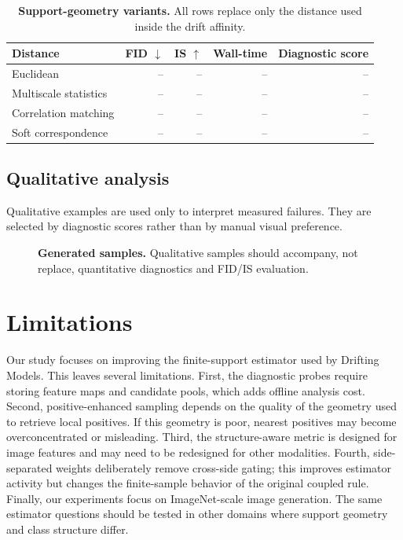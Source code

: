 \documentclass{article}
\newcommand{\placeholderbox}[2]{
\begin{center}
\fbox{
\begin{minipage}[c][#1][c]{0.92\linewidth}
\centering
\textcolor{mlgray}{#2}
\end{minipage}
}
\end{center}
}
\begin{document}
\begin{table}[h!]
\centering
\caption{
\textbf{Support-geometry variants.}
All rows replace only the distance used inside the drift affinity.
}
\label{tab:metric_variants}
\begin{tabular}{lrrrr}
\toprule
Distance & FID $\downarrow$ & IS $\uparrow$ & Wall-time & Diagnostic score \\
\midrule
Euclidean & -- & -- & -- & -- \\
Multiscale statistics & -- & -- & -- & -- \\
Correlation matching & -- & -- & -- & -- \\
Soft correspondence & -- & -- & -- & -- \\
\bottomrule
\end{tabular}
\end{table}



\subsection{Qualitative analysis}
\label{subsec:qualitative_analysis}

Qualitative examples are used only to interpret measured failures.
They are selected by diagnostic scores rather than by manual visual preference.

\begin{figure}[h!]
\centering
\placeholderbox{0.28\textheight}{
Sample grid.\\
Rows: baseline, strongest single-component variant, full estimator.\\
Columns: ImageNet classes or random seeds.
}
\caption{
\textbf{Generated samples.}
Qualitative samples should accompany, not replace, quantitative diagnostics and FID/IS evaluation.
}
\label{fig:sample_grid}
\end{figure}



\section{Limitations}
\label{sec:limitations}

Our study focuses on improving the finite-support estimator used by Drifting Models.
This leaves several limitations.
First, the diagnostic probes require storing feature maps and candidate pools, which adds offline analysis cost.
Second, positive-enhanced sampling depends on the quality of the geometry used to retrieve local positives.
If this geometry is poor, nearest positives may become overconcentrated or misleading.
Third, the structure-aware metric is designed for image features and may need to be redesigned for other modalities.
Fourth, side-separated weights deliberately remove cross-side gating; this improves estimator activity but changes the finite-sample behavior of the original coupled rule.
Finally, our experiments focus on ImageNet-scale image generation.
The same estimator questions should be tested in other domains where support geometry and class structure differ.
\end{document}
